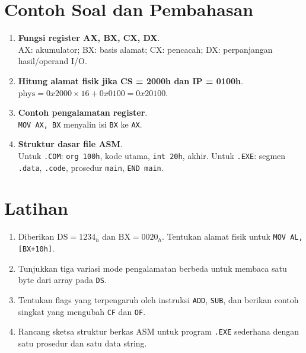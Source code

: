 \documentclass[../main.tex]{subfiles}
\begin{document}
\section{Contoh Soal dan Pembahasan}
\begin{enumerate}
  \item \textbf{Fungsi register AX, BX, CX, DX}.\\ AX: akumulator; BX: basis alamat; CX: pencacah; DX: perpanjangan hasil/operand I/O.
  \item \textbf{Hitung alamat fisik jika CS = 2000h dan IP = 0100h}.\\ \(\text{phys} = 0x2000\times 16 + 0x0100 = 0x20100\).
  \item \textbf{Contoh pengalamatan register}.\\ \texttt{MOV AX, BX} menyalin isi \texttt{BX} ke \texttt{AX}.
  \item \textbf{Struktur dasar file ASM}.\\ Untuk \texttt{.COM}: \texttt{org 100h}, kode utama, \texttt{int 20h}, akhir. Untuk \texttt{.EXE}: segmen \texttt{.data}, \texttt{.code}, prosedur \texttt{main}, \texttt{END main}.
\end{enumerate}

\section{Latihan}
\begin{enumerate}
  \item Diberikan \(\text{DS}=1234_h\) dan \(\text{BX}=0020_h\). Tentukan alamat fisik untuk \texttt{MOV AL, [BX+10h]}.
  \item Tunjukkan tiga variasi mode pengalamatan berbeda untuk membaca satu byte dari array pada \texttt{DS}.
  \item Tentukan flags yang terpengaruh oleh instruksi \texttt{ADD}, \texttt{SUB}, dan berikan contoh singkat yang mengubah \texttt{CF} dan \texttt{OF}.
  \item Rancang sketsa struktur berkas ASM untuk program \texttt{.EXE} sederhana dengan satu prosedur dan satu data string.
\end{enumerate}
\end{document}

